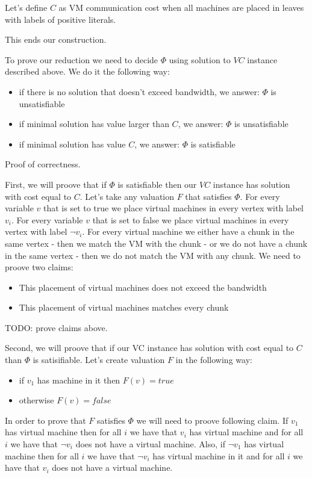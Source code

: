 Let's define $C$ as VM communication cost when all machines are placed in leaves with labels of
positive literals.

This ends our construction.

To prove our reduction we need to decide $\Phi$ using solution to $VC$ instance described above. We do it the
following way:

\begin{itemize}
\item if there is no solution that doesn't exceed bandwidth, we
  answer: $\Phi$ is unsatisfiable
\item if minimal solution has value larger than $C$, we answer: $\Phi$
  is unsatisfiable
\item if minimal solution has value $C$, we answer: $\Phi$ is satisfiable
\end{itemize}

Proof of correctness.

First, we will proove that if $\Phi$ is satisfiable then our $VC$
instance has solution with cost equal to $C$. Let's take any valuation $F$
that satisfies $\Phi$. For every variable $v$ that is set to true we
place virtual machines in every vertex with label $v_i$. For every
variable $v$ that is set to false we place virtual machines in every
vertex with label $\neg v_i$. For every virtual machine we either have
a chunk in the same vertex - then we match the VM with the chunk - or
we do not have a chunk in the same vertex - then we do not match the
VM with any chunk. We need to proove two claims:
\begin{itemize}
\item This placement of virtual machines does not exceed the bandwidth
\item This placement of virtual machines matches every chunk
\end{itemize}

TODO: prove claims above.

Second, we will proove that if our VC instance has solution with cost
equal to $C$ than $\Phi$ is satisifiable. Let's create valuation $F$
in the following way:

\begin{itemize}
\item if $v_1$ has machine in it then $F(v) = true$
\item otherwise $F(v) = false$
\end{itemize}

In order to prove that $F$ satisfies $\Phi$ we will need to proove
following claim. If $v_1$ has virtual machine then for all $i$ we have
that $v_i$ has virtual machine and for all $i$ we have that $\neg v_i$
does not have a virtual machine. Also, if $\neg v_1$ has virtual
machine then for all $i$ we have that $\neg v_i$ has virtual machine
in it and for all $i$ we have that $v_i$ does not have a virtual
machine. 

